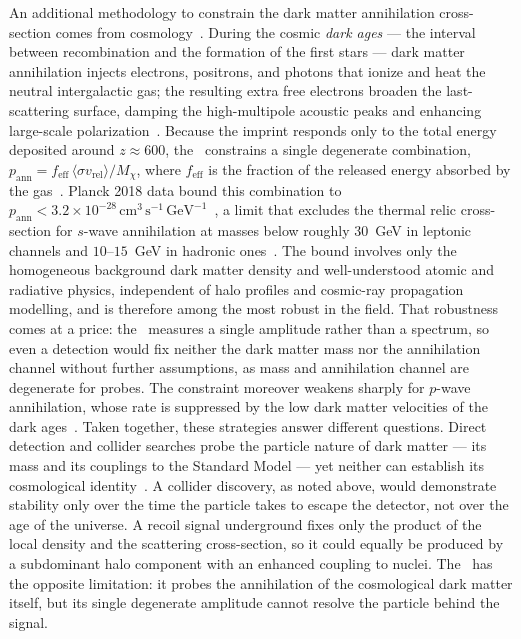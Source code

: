 An additional methodology to constrain the dark matter annihilation cross-section comes from cosmology~\cite{Lopez-Honorez:2013cua}.
During the cosmic \emph{dark ages} --- the interval between recombination and the formation of the first stars --- dark matter annihilation injects electrons, positrons, and photons that ionize and heat the neutral intergalactic gas; the resulting extra free electrons broaden the last-scattering surface, damping the high-multipole acoustic peaks and enhancing large-scale polarization~\cite{Slatyer:2015jla}.
Because the imprint responds only to the total energy deposited around $z \approx 600$, the \CMB\ constrains a single degenerate combination, $p_\text{ann} = f_\text{eff}\,\langle \sigma v_\text{rel} \rangle / M_\chi$, where $f_\text{eff}$ is the fraction of the released energy absorbed by the gas~\cite{Slatyer:2015jla}.
Planck 2018 data bound this combination to $p_\text{ann} < 3.2 \times 10^{-28}\,\text{cm}^3\,\text{s}^{-1}\,\text{GeV}^{-1}$~\cite{Aghanim:2018eyx}, a limit that excludes the thermal relic cross-section for $s$-wave annihilation at masses below roughly $30$~GeV in leptonic channels and $10$--$15$~GeV in hadronic ones~\cite{Lopez-Honorez:2013cua}.
The bound involves only the homogeneous background dark matter density and well-understood atomic and radiative physics, independent of halo profiles and cosmic-ray propagation modelling, and is therefore among the most robust in the field.
That robustness comes at a price: the \CMB\ measures a single amplitude rather than a spectrum, so even a detection would fix neither the dark matter mass nor the annihilation channel without further assumptions, as mass and annihilation channel are degenerate for \CMB probes.
The constraint moreover weakens sharply for $p$-wave annihilation, whose rate is suppressed by the low dark matter velocities of the dark ages~\cite{Cirelli:2024ssz}.
Taken together, these strategies answer different questions.
Direct detection and collider searches probe the particle nature of dark matter --- its mass and its couplings to the Standard Model --- yet neither can establish its cosmological identity~\cite{Cirelli:2024ssz}.
A collider discovery, as noted above, would demonstrate stability only over the time the particle takes to escape the detector, not over the age of the universe.
A recoil signal underground fixes only the product of the local density and the scattering cross-section, so it could equally be produced by a subdominant halo component with an enhanced coupling to nuclei.
The \CMB\ has the opposite limitation: it probes the annihilation of the cosmological dark matter itself, but its single degenerate amplitude cannot resolve the particle behind the signal.
